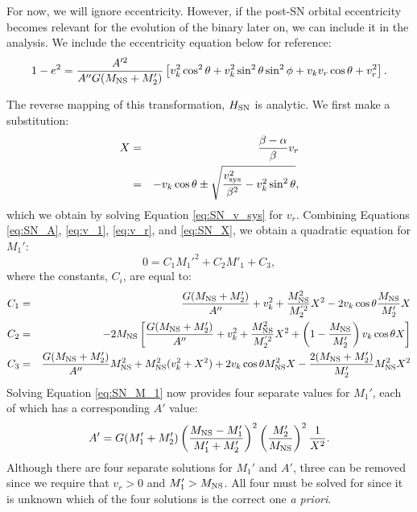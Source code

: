 \documentclass[12pt, preprint]{aastex}
\begin{document}
For now, we will ignore eccentricity. However, if the post-SN orbital eccentricity becomes relevant for the evolution of the binary later on, we can include it in the analysis. We include the eccentricity equation below for reference:
\begin{equation}
1-e^2 = \frac{A'^2}{A'' G (M_{\rm NS} + M_2')} \left[ v_k^2 \cos^2\theta + v_k^2 \sin^2 \theta \sin^2 \phi + v_k v_r \cos \theta + v_r^2  \right]. \label{eq:SN_e}
\end{equation}

The reverse mapping of this transformation, $H_{\rm SN}$ is analytic. We first make a substitution:
\begin{eqnarray}
X &=& \frac{\beta - \alpha}{\beta} v_r \nonumber \\
&=& -v_k \cos\theta \pm \sqrt{\frac{v_{\rm sys}^2}{\beta^2} - v_k^2 \sin^2\theta}, \label{eq:SN_X}
\end{eqnarray}
which we obtain by solving Equation \ref{eq:SN_v_sys} for $v_r$. Combining Equations \ref{eq:SN_A}, \ref{eq:v_1}, \ref{eq:v_r}, and \ref{eq:SN_X}, we obtain a quadratic equation for $M_1'$:
\begin{equation}
0 = C_1 M_1'^{2} + C_2 M'_1 + C_3, \label{eq:SN_M_1}
\end{equation}
where the constants, $C_i$, are equal to:
\begin{eqnarray}
C_1 &=& \frac{G(M_{\rm NS} + M'_2)}{A''} + v_k^2 + \frac{M_{\rm NS}^2}{M_2^{'2}}X^2 - 2 v_k \cos \theta \frac{M_{\rm NS}}{M'_2}X \\
C_2 &=& -2M_{\rm NS} \left[ \frac{G(M_{\rm NS} + M'_2)}{A''} + v_k^2 + \frac{M_{\rm NS}^2}{M_2^{'2}}X^2 + \left( 1 - \frac{M_{\rm NS}}{M'_2} \right) v_k \cos \theta X \right] \\
C_3 &=& \frac{G(M_{\rm NS} + M'_2)}{A''} M_{\rm NS}^2 + M_{\rm NS}^2 (v_k^2 + X^2) + 2v_k \cos \theta M_{\rm NS}^2 X - \frac{2(M_{\rm NS} + M'_2)}{M'_2} M_{\rm NS}^2X^2
\end{eqnarray}
Solving Equation \ref{eq:SN_M_1} now provides four separate values for $M_1'$, each of which has a corresponding $A'$ value:
\begin{equation}
A' = G (M_1' + M_2') \left(\frac{M_{\rm NS} - M_1'}{M_1' + M_2'} \right)^2 \left( \frac{M_2'}{M_{\rm NS}} \right)^2 \frac{1}{X^2}. \label{eq:SN_A1}
\end{equation}
Although there are four separate solutions for $M_1'$ and $A'$, three can be removed since we require that $v_r > 0$ and $M'_1 > M_{\rm NS}$. All four must be solved for since it is unknown which of the four solutions is the correct one {\it a priori}.
\end{document}
